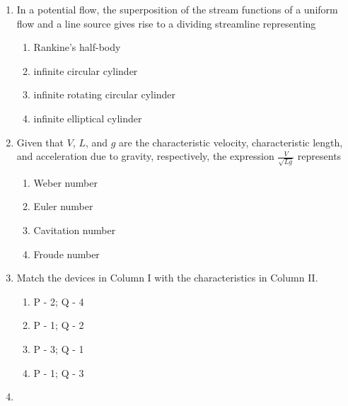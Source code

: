 \documentclass[journal]{IEEEtran}
\begin{document}
\begin{enumerate}
{	}
    \item{
            In a potential flow, the superposition of the stream functions of a uniform flow and a line source gives rise to a dividing streamline representing
            
                
            \begin{multicols}{2}
                \begin{enumerate}
                	\item Rankine’s half-body
                	\item infinite circular cylinder
                	\item infinite rotating circular cylinder
                	\item infinite elliptical cylinder
                \end{enumerate}
            \end{multicols}

        
        }
    \item{
            Given that \(V\), \(L\), and \(g\) are the characteristic velocity, characteristic length, and acceleration due to gravity, respectively, the expression $
            \frac{V}{\sqrt{Lg}}
            $
            represents
          
            \begin{multicols}{2}
                \begin{enumerate}
                \item Weber number
                \item Euler number
                \item Cavitation number
                \item Froude number
                \end{enumerate}
            \end{multicols}
        
        }
    \item{
            Match the devices in Column I with the characteristics in Column II.
            
            \begin{multicols}{4}
				\begin{enumerate}
					\item P - 2; Q - 4
					\item P - 1; Q - 2
					\item P - 3; Q - 1
					\item P - 1; Q - 3
				\end{enumerate}
			\end{multicols}
        }
    \item{
        
}
\end{enumerate}
\end{document}
